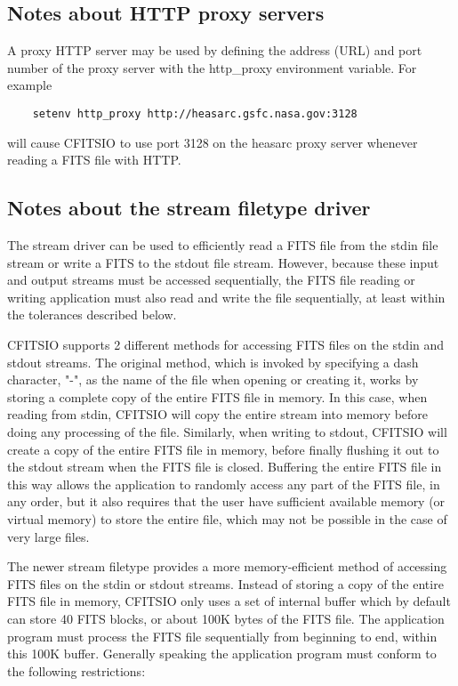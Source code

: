 \documentclass[11pt]{book}
\begin{document}
\subsection{Notes about HTTP proxy servers}

A proxy HTTP server may be used by defining the address (URL) and port
number of the proxy server with the http\_proxy environment variable.
For example

\begin{verbatim}
    setenv http_proxy http://heasarc.gsfc.nasa.gov:3128
\end{verbatim}
will cause CFITSIO to use port 3128 on the heasarc proxy server whenever
reading a FITS file with HTTP.


\subsection{Notes about the stream filetype driver}

The stream driver can be used to efficiently read a FITS file from the stdin
file stream or write a FITS to the stdout file stream.  However, because these
input and output streams must be accessed sequentially, the FITS file reading or
writing application must also read and write the file sequentially, at least
within the tolerances described below.

CFITSIO supports 2 different methods for accessing FITS files on the stdin and
stdout streams.  The original method, which is invoked by specifying a dash
character, "-", as the name of the file when opening or creating it, works by
storing a complete copy of the entire FITS file in memory.  In this case, when
reading from stdin, CFITSIO will copy the entire stream into memory before doing
any processing of the file.  Similarly, when writing to stdout, CFITSIO will
create a copy of the entire FITS file in memory, before finally flushing it out
to  the stdout stream when the FITS file is closed.  Buffering the entire FITS
file in this way allows the application to randomly access any part of the FITS
file, in any order, but it also requires that the user have sufficient available
memory (or virtual memory) to store the entire file, which may not be possible
in the case of very large files.

The newer stream filetype provides a more memory-efficient method of accessing
FITS files on the stdin or stdout streams.  Instead of storing a copy of the
entire FITS file in memory, CFITSIO only uses a set of internal  buffer which by
default can store  40 FITS blocks, or about  100K bytes of the FITS file.  The
application program must process the FITS file sequentially from beginning to
end, within this 100K buffer.  Generally speaking the application  program must
conform to the following restrictions:
\end{document}

